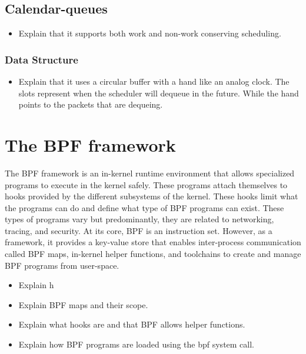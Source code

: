 \documentclass[sigconf, nonacm]{acmart}
\begin{document}
\subsection{Calendar-queues}

\begin{itemize}
  \item Explain that it supports both work and non-work conserving scheduling.
\end{itemize}


\subsubsection{Data Structure}

\begin{itemize}
  \item Explain that it uses a circular buffer with a hand like an analog clock. The slots represent when the scheduler will dequeue in the future. While the hand points to the packets that are dequeing.
\end{itemize}


\section{The BPF framework}

The BPF framework is an in-kernel runtime environment that allows specialized
programs to execute in the kernel safely. These programs attach themselves to
hooks provided by the different subsystems of the kernel. These hooks limit what
the programs can do and define what type of BPF programs can exist. These types
of programs vary but predominantly, they are related to networking, tracing, and
security. At its core, BPF is an instruction set. However, as a framework, it
provides a key-value store that enables inter-process communication called BPF
maps, in-kernel helper functions, and toolchains to create and manage BPF
programs from user-space.


\begin{itemize}
  \item Explain h
  \item Explain BPF maps and their scope.
  \item Explain what hooks are and that BPF allows helper functions.
  \item Explain how BPF programs are loaded using the bpf system call.
\end{itemize}
\end{document}
